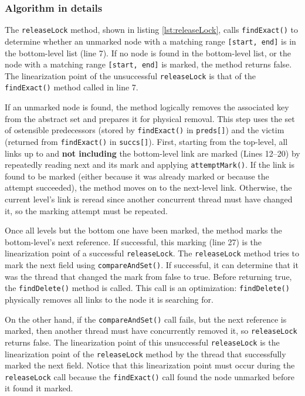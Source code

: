 \subsubsection*{Algorithm in details}

The \texttt{releaseLock} method, shown in listing \ref{lst:releaseLock}, calls \texttt{findExact()} to determine whether an unmarked node with a matching range \texttt{[start, end]} is in the bottom-level list (line 7).
If no node is found in the bottom-level list, or the node with a matching range \texttt{[start, end]} is marked, the method returns false.
The linearization point of the unsuccessful \texttt{releaseLock} is that of the \texttt{findExact()} method called in line 7.

If an unmarked node is found, the method logically removes the associated key from the abstract set and prepares it for physical removal.
This step uses the set of ostensible predecessors (stored by \texttt{findExact()} in \texttt{preds[]}) and the victim (returned from \texttt{findExact()} in \texttt{succs[]}).
First, starting from the top-level, all links up to and \textbf{not including} the bottom-level link are marked (Lines 12--20) by repeatedly reading next and its mark and applying \texttt{attemptMark()}.
If the link is found to be marked (either because it was already marked or because the attempt succeeded), the method moves on to the next-level link.
Otherwise, the current level's link is reread since another concurrent thread must have changed it, so the marking attempt must be repeated.

Once all levels but the bottom one have been marked, the method marks the bottom-level's next reference.
If successful, this marking (line 27) is the linearization point of a successful \texttt{releaseLock}. The \texttt{releaseLock} method tries to mark the next field using \texttt{compareAndSet()}.
If successful, it can determine that it was the thread that changed the mark from false to true. Before returning true, the \texttt{findDelete()} method is called. This call is an optimization: \texttt{findDelete()} physically removes all links to the node it is searching for.

On the other hand, if the  \texttt{compareAndSet()} call fails, but the next reference is marked, then another thread must have concurrently removed it, so \texttt{releaseLock} returns false.
The linearization point of this unsuccessful \texttt{releaseLock} is the linearization point of the \texttt{releaseLock} method by the thread that successfully marked the next field.
Notice that this linearization point must occur during the \texttt{releaseLock} call because the \texttt{findExact()} call found the node unmarked before it found it marked.

